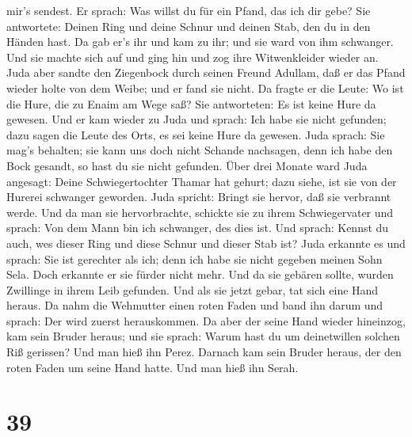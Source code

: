 mir's sendest.  Er sprach: Was willst du für ein Pfand, das
ich dir gebe? Sie antwortete: Deinen Ring und deine Schnur und deinen
Stab, den du in den Händen hast. Da gab er's ihr und kam zu ihr; und sie
ward von ihm schwanger.  Und sie machte sich auf und ging
hin und zog ihre Witwenkleider wieder an.  Juda aber sandte
den Ziegenbock durch seinen Freund Adullam, daß er das Pfand wieder
holte von dem Weibe; und er fand sie nicht.  Da fragte er
die Leute: Wo ist die Hure, die zu Enaim am Wege saß? Sie antworteten:
Es ist keine Hure da gewesen.  Und er kam wieder zu Juda
und sprach: Ich habe sie nicht gefunden; dazu sagen die Leute des Orts,
es sei keine Hure da gewesen.  Juda sprach: Sie mag's
behalten; sie kann uns doch nicht Schande nachsagen, denn ich habe den
Bock gesandt, so hast du sie nicht gefunden.  Über drei
Monate ward Juda angesagt: Deine Schwiegertochter Thamar hat gehurt;
dazu siehe, ist sie von der Hurerei schwanger geworden. Juda spricht:
Bringt sie hervor, daß sie verbrannt werde.  Und da man sie
hervorbrachte, schickte sie zu ihrem Schwiegervater und sprach: Von dem
Mann bin ich schwanger, des dies ist. Und sprach: Kennst du auch, wes
dieser Ring und diese Schnur und dieser Stab ist?  Juda
erkannte es und sprach: Sie ist gerechter als ich; denn ich habe sie
nicht gegeben meinen Sohn Sela. Doch erkannte er sie fürder nicht mehr.
 Und da sie gebären sollte, wurden Zwillinge in ihrem Leib
gefunden.  Und als sie jetzt gebar, tat sich eine Hand
heraus. Da nahm die Wehmutter einen roten Faden und band ihn darum und
sprach: Der wird zuerst herauskommen.  Da aber der seine
Hand wieder hineinzog, kam sein Bruder heraus; und sie sprach: Warum
hast du um deinetwillen solchen Riß gerissen? Und man hieß ihn Perez.
 Darnach kam sein Bruder heraus, der den roten Faden um
seine Hand hatte. Und man hieß ihn Serah.

\hypertarget{section-38}{%
\section{39}\label{section-38}}


